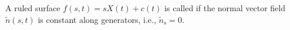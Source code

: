 A ruled surface $f(s, t) = s X(t) + c(t)$ is called  if the normal vector field $\tilde{n}(s, t)$ is constant along generators, i.e., $\tilde{n}_s = 0$.
